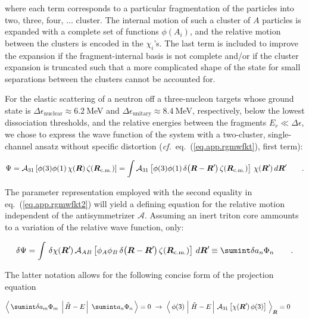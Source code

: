 \documentclass[aps,onecolumn,preprintnumbers,amsmath,amssymb,nofootinbib,superscriptaddress,notitlepage]{revtex4-1}
\newcommand{\eref}[1]{eq.~(\ref{#1})}
\newcommand{\cf}{\textit{cf.}~}
\newcommand{\ve}[1]{\ensuremath{\boldsymbol{#1}}}
\newcommand{\rcm}{\ensuremath{\ve{R}_\text{\scriptsize{c.m.}}}}
\newcommand*{\mprime}{^{\prime}\mkern-1.2mu}
\newcommand{\me}[3] {\left\langle\,#1\,\left.\left|\,#2\,\right|\right.\,#3\,\right\rangle}
\newcommand{\mer}[3] {\left\langle\,#1\,\left|\left.\,#2\,\right|\,#3\,\right.\right\rangle_{\ve{R}}}
\begin{document}
where each term corresponds to a particular fragmentation of the particles into two, three, four, $\ldots$ cluster.
The internal motion of such a cluster of $A$ particles is expanded with a complete set of functions $\phi(A_i)$, and the
relative motion between the clusters is encoded in the $\chi_i$'s. The last term is included to improve the expansion if the
fragment-internal basis is not complete and/or if the cluster expansion is truncated such that a more complicated shape
of the state for small separations between the clusters cannot be accounted for.

For the elastic scattering of a neutron off a three-nucleon targets whose ground state is 
$\Delta\epsilon_\text{nuclear}\approx6.2~$MeV and
$\Delta\epsilon_\text{unitary}\approx8.4~$MeV, respectively, below the lowest dissociation thresholds,
and the relative energies between the fragments $E_r\ll\Delta\epsilon$,
we chose to express the wave function of the system with a two-cluster, single-channel ansatz
without specific distortion (\cf\eref{eq.app.rgmwfkt}, first term):

\begin{equation}\label{eq.app.rgmwfkt2}
\Psi
=
\mathcal{A}_{31}\left[\phi(3)\phi(1)\,\chi(\ve{R})\,\zeta(\rcm)\right]
=
\int\mathcal{A}_{31}\left[\phi(3)\phi(1)\,\delta\big(\ve{R}-\ve{R}\mprime\big)\,\zeta(\rcm)\right]\,\chi(\ve{R}\mprime)\,d\ve{R}\mprime
\qquad.
\end{equation}

The parameter representation employed with the second equality in \eref{eq.app.rgmwfkt2}
will yield a defining equation for the relative motion independent of the antisymmetrizer $\mathcal{A}$.
Assuming an inert triton core ammounts to a variation of the relative wave function, only:

\begin{equation}\label{eq.app.rgmwfkt}
\delta\Psi
=
\int\,\delta\chi(\ve{R}\mprime)\,\mathcal{A}_{AB}\left[\phi_A\phi_B\,\delta\big(\ve{R}-\ve{R}\mprime\big)\,\zeta(\rcm)\right]\,d\ve{R}\mprime
\equiv
\sumint \delta a_n\Phi_n
\qquad.
\end{equation}

The latter notation allows for the following concise form of the projection equation

\begin{equation}\label{eq.app.rgmwfkt}
\me{\sumint \delta a_m\Phi_m}{\hat{H}-E}{ \sumint a_n\Phi_n}=0
~\to~\mer{\phi(3)}{\hat{H}-E}{\mathcal{A}_{31}\left[\chi(\ve{R}\mprime)\,\phi(3)\right]}=0
\qquad
\end{equation}
\end{document}
